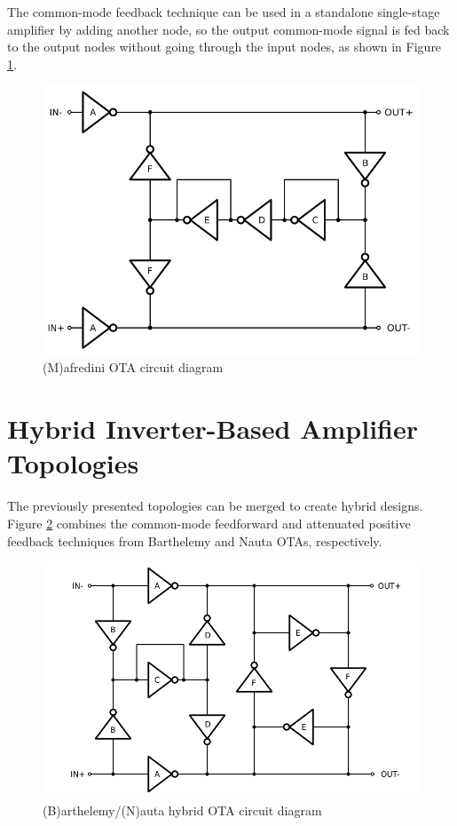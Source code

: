 \documentclass[conference]{IEEEtran}
\begin{document}
	The common-mode feedback technique can be used in a standalone single-stage amplifier \cite{manfredini2020ultra} by adding another node, so the output common-mode signal is fed back to the output nodes without going through the input nodes, as shown in Figure \ref{fig:manf:sch}.
	
	\begin{figure}[!htbp]
		\centerline{\includegraphics[scale=0.50]{circuits/manf.pdf}}
		\caption{(M)afredini OTA circuit diagram \cite{manfredini2020ultra}}
		\label{fig:manf:sch}
	\end{figure}
	
	
	\section{Hybrid Inverter-Based Amplifier Topologies}\label{sc:hybrid}
	
	The previously presented topologies can be merged to create hybrid designs. Figure \ref{fig:barthnauta:sch} combines the common-mode feedforward and attenuated positive feedback techniques from Barthelemy and Nauta OTAs, respectively.
	
	\begin{figure}[!htbp]
		\centerline{\includegraphics[scale=0.50]{circuits/barthnauta.pdf}}
		\caption{(B)arthelemy/(N)auta hybrid OTA circuit diagram}
		\label{fig:barthnauta:sch}
	\end{figure}
	
\end{document}
